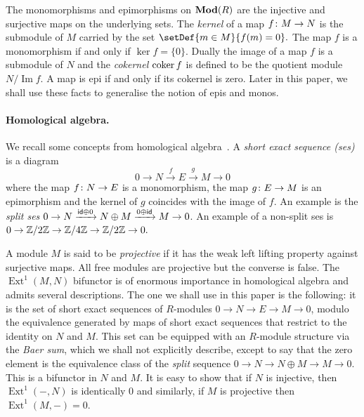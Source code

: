 \documentclass[runningheads]{llncs}
\begin{document}
The monomorphisms and epimorphisms on $\operatorname{\mathbf{Mod}}(R)$ are the injective and surjective maps on the underlying sets. The \emph{kernel} of a map $f \colon M\to N$ is the submodule of $M$ carried by the set $\setDef{m\in M }{f(m) = 0}.$ The map $f$ is a monomorphism if and only if $\ker f = \{0\}.$ Dually the image of a map $f$ is a submodule of $N$ and the \emph{cokernel} $\operatorname{\operatorname{coker}}{f}$ is defined to be the quotient module $N/\operatorname{Im} f.$ A map is epi if and only if its cokernel is zero.  Later in this paper, we shall use these facts to generalise the notion of epis and monos.


\paragraph*{Homological algebra.}
We recall some concepts from  homological algebra~\cite{weibel94}.
A \emph{short exact sequence (ses)} is a diagram
\begin{equation*}
0 \to N  \xrightarrow{f} E  \xrightarrow{g} M  \to 0
\end{equation*}
where the map $f\colon N\to E$ is a monomorphism, the map $g \colon E\to M$ is an epimorphism and the kernel of $g$ coincides with the image of $f$. An example is the \emph{split ses} $0 \to N \xrightarrow{\mathsf{id}\oplus 0} N\oplus M \xrightarrow{0\oplus \mathsf{id}} M \to 0$. An example of a non-split ses is $0 \to \mathbb{Z}/2\mathbb{Z} \to \mathbb{Z}/4\mathbb{Z} \to \mathbb{Z}/2\mathbb{Z} \to 0.$   

A module $M$ is said to be \emph{projective} if it has the weak left lifting property against surjective maps. All free modules are projective but the converse is false. The $\operatorname{Ext}^1(M, N)$ bifunctor  is of enormous importance in homological algebra and admits several descriptions. The one we shall use in this paper is the following: it is the set of short exact sequences of $R$-modules  $0 \to N \to E \to M \to 0$, modulo the equivalence generated by maps of short exact sequences that restrict to the identity on $N$ and $M.$ This set can be equipped with an $R$-module structure via the \emph{Baer sum}, which we shall not explicitly describe, except to say that the zero element is the equivalence class of the \emph{split} sequence $0 \to N \to N\oplus M \to M \to 0$. This is a bifunctor in $N$ and $M$.  It is easy to show that if $N$ is injective, then $\operatorname{Ext}^1(-, N)$ is identically 0 and similarly, if $M$ is projective then $\operatorname{Ext}^1(M, -)= 0$.
\end{document}
